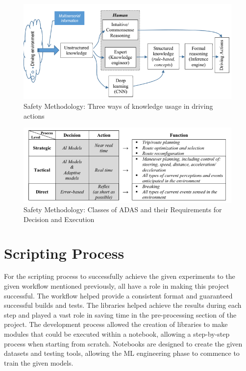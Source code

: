 \documentclass[12pt]{report} %
\begin{document}
		\begin{figure}[ht]
			\centering
			\includegraphics[width=.60\columnwidth]{Figures/literature_review/proposal/SystemFunctionality-2.png}
			\caption{Safety Methodology: Three ways of knowledge usage in driving actions~\cite{ionita_autonomous_2017}}
			\label{fig:avmOperationalMethodology-SF2}
		\end{figure}

		\begin{figure}[ht]
			\centering
			\includegraphics[width=.60\columnwidth]{Figures/literature_review/proposal/SystemFunctionality-3.png}
			\caption{Safety Methodology: Classes of ADAS and their Requirements for Decision and Execution~\cite{ionita_autonomous_2017}}
			\label{fig:avmOperationalMethodology-SF3}
		\end{figure}



\chapter{Scripting Process}
\label{chap:scriptingProcess}
	For the scripting process to successfully achieve the given experiments to the given workflow mentioned previously, all have a role in making this project successful. The workflow helped provide a consistent format and guaranteed successful builds and tests. The libraries helped achieve the results during each step and played a vast role in saving time in the pre-processing section of the project. The development process allowed the creation of libraries to make modules that could be executed within a notebook, allowing a step-by-step process when starting from scratch. Notebooks are designed to create the given datasets and testing tools, allowing the ML engineering phase to commence to train the given models.
\end{document}
